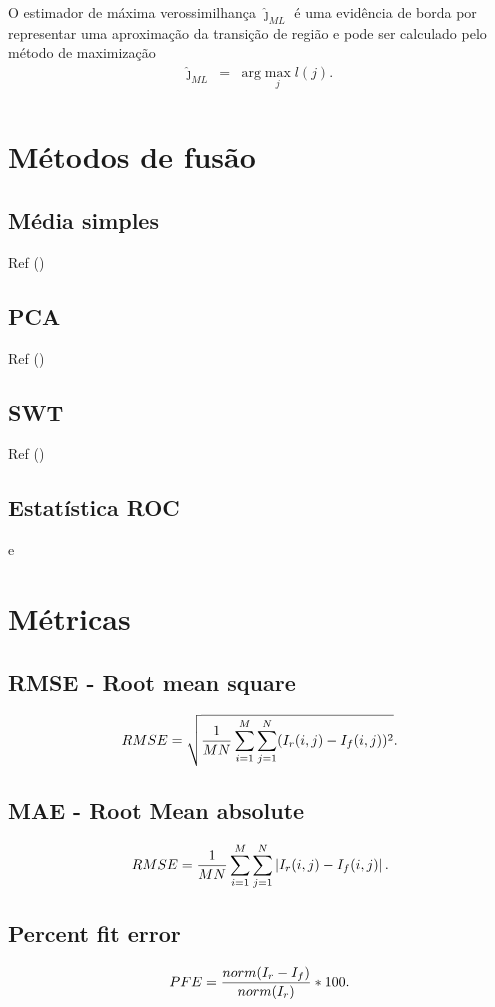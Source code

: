 \documentclass[conference]{IEEEtran}
\begin{document}
O estimador de máxima verossimilhança $\widehat{\jmath}_{ML}$ é uma evidência de borda por representar uma aproximação da transição de região e pode ser calculado pelo método de maximização
\begin{equation}
\begin{array}{rcl}
	\widehat{\jmath}_{ML}&=&\text{arg}\max\limits_{j}l(j).  \\
\end{array}
\end{equation}
\section{Métodos de fusão}
\subsection{Média simples}
Ref (\cite{mit})
\subsection{PCA}
Ref (\cite{n_r})
\subsection{SWT}
Ref (\cite{n_r})
\subsection{Estatística ROC}
\cite{gs} e \cite{fawcett}
\section{Métricas}
\subsection{RMSE - Root mean square}
\begin{equation}
	RMSE=\sqrt{\frac{1}{MN}\sum_{i=1}^M\sum_{j=1}^N(I_r(i,j)-I_f(i,j))^2}.  \\
\end{equation}
\subsection{MAE - Root Mean absolute}
\begin{equation}
	RMSE=\frac{1}{MN}\sum_{i=1}^M\sum_{j=1}^N\left|I_r(i,j)-I_f(i,j)\right|.  \\
\end{equation}
\subsection{Percent fit error}
\begin{equation}
	PFE=\frac{norm(I_r-I_f)}{norm(I_r)}*100.  \\
\end{equation}
\end{document}
